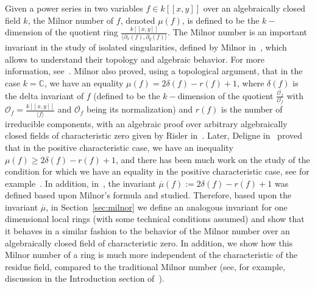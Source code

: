 \documentclass{article}
\numberwithin{theorem}{section}
\begin{document}
Given a power series in two variables $f \in k[[x,y]]$ over an algebraically closed field $k$, the Milnor  number of $f$, denoted $\mu(f)$, is defined to be the $k-$dimension of the quotient ring $\frac{k[[x,y]]}{\langle \partial_x(f), \partial_y(f) \rangle}$. The Milnor number is an important invariant in the study of isolated singularities, defined by Milnor in~\cite{milnor1968singular}, which allows to understand their topology and algebraic behavior. For more information, see~\cite{greuel2007introduction, varchenko1985singularities}. Milnor also proved, using a topological argument, that in the case $k=\mathbb{C}$, we have an equality $\mu(f)=2\delta(f)-r(f)+1$, where $\delta(f)$ is the delta invariant of $f$ (defined to be the $k-$dimension of the quotient $\frac{\overline{\mathcal{O}_f}}{\mathcal{O}_f}$ with $\mathcal{O}_f=\frac{k[[x,y]]}{\langle f \rangle}$ and $\overline{\mathcal{O}_f}$ being its normalization) and $r(f)$ is the number of irreducible components, with an algebraic proof over arbitrary algebraically closed fields of characteristic zero given by Risler in~\cite{risler1971ideal}. Later,  Deligne in~\cite{deligne2006formule} proved that in the positive characteristic case, we have an inequality $\mu(f)\geq 2\delta(f)-r(f)+1$, and there has been much work on the study of the condition for which we have an equality in the positive characteristic case, see for example~\cite{melle2001pencils, nguyen2016invariants, boubakri2012invariants, greuel2012some, barroso2018milnor, barroso2016milnor}. In addition, in~\cite{barroso2022note}, the invariant $\overline{\mu}(f) :=2\delta(f)-r(f)+1$ was defined based upon Milnor's formula and studied. Therefore, based upon the invariant $\overline{\mu}$, in Section~\ref{sec:milnor} we define an analogous invariant for one dimensional local rings (with some technical conditions assumed) and show that it behaves in a similar fashion to the behavior of the Milnor number over an algebraically closed field of characteristic zero. In addition, we show how this Milnor number of a ring is much more independent of the characteristic of the residue field, compared to the traditional Milnor number (see, for example, discussion in the Introduction section of~\cite{boubakri2009hypersurface}). \\
\end{document}
